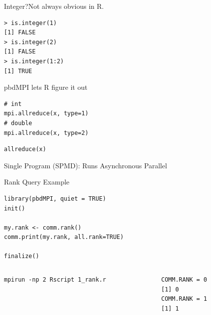 \begin{frame}[fragile]
  \begin{block}{Integer?\qquad Not always obvious in R.}
    \vspace{-.2cm}
    \begin{lstlisting}
> is.integer(1)
[1] FALSE
> is.integer(2)
[1] FALSE
> is.integer(1:2)
[1] TRUE
    \end{lstlisting}
  \end{block}
  \begin{block}{pbdMPI lets R figure it out}\pause
    \begin{minipage}[t]{.475\textwidth}
      \begin{lstlisting}[title=Rmpi]
# int
mpi.allreduce(x, type=1)
# double
mpi.allreduce(x, type=2)
      \end{lstlisting}
    \end{minipage}
    \hfill
    \begin{minipage}[t]{.475\textwidth}
      \begin{lstlisting}[title=pbdMPI]
allreduce(x)
      \end{lstlisting}
    \end{minipage}
  \end{block}
\end{frame}


\begin{frame}[fragile]{Single Program (SPMD): Runs Asynchronous Parallel}
  \begin{exampleblock}{Rank Query Example}
    \centering
    \begin{lstlisting}[title=1\_rank.r]
library(pbdMPI, quiet = TRUE)
init()

my.rank <- comm.rank()
comm.print(my.rank, all.rank=TRUE)

finalize()
    \end{lstlisting}
    \begin{columns}[t,onlytextwidth]
      \begin{column}{0.62\textwidth}
        \begin{lstlisting}[backgroundcolor=\color{white},keywordstyle=\color{black},
title=Execute this batch script via:]
mpirun -np 2 Rscript 1_rank.r
        \end{lstlisting}
      \end{column}
      \hfill
      \begin{column}{0.35\textwidth}
        \begin{lstlisting}[title=Sample Output:]
COMM.RANK = 0
[1] 0
COMM.RANK = 1
[1] 1
        \end{lstlisting}
      \end{column}
    \end{columns}
  \end{exampleblock}
\end{frame}

